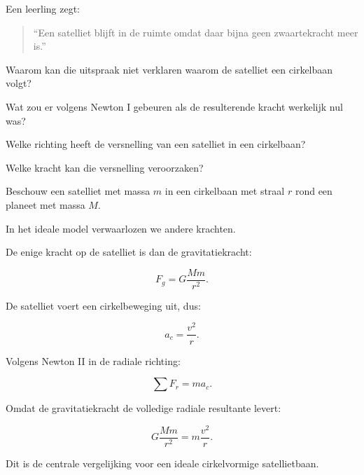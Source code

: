 \documentclass{ximera}
\begin{document}
\begin{oefening}{\oefU\ESS}

Een leerling zegt:

\begin{quote}
``Een satelliet blijft in de ruimte omdat daar bijna geen zwaartekracht
meer is.''
\end{quote}

\begin{question}
Waarom kan die uitspraak niet verklaren waarom de satelliet een
cirkelbaan volgt?
\end{question}

\begin{question}
Wat zou er volgens Newton I gebeuren als de resulterende kracht werkelijk
nul was?
\end{question}

\begin{question}
Welke richting heeft de versnelling van een satelliet in een
cirkelbaan?
\end{question}

\begin{question}
Welke kracht kan die versnelling veroorzaken?
\end{question}

\end{oefening}




Beschouw een satelliet met massa $m$ in een cirkelbaan met straal $r$
rond een planeet met massa $M$.

In het ideale model verwaarlozen we andere krachten.

De enige kracht op de satelliet is dan de gravitatiekracht:

\[
F_g=G\frac{Mm}{r^2}.
\]

De satelliet voert een cirkelbeweging uit, dus:

\[
a_c=\frac{v^2}{r}.
\]

Volgens Newton II in de radiale richting:

\[
\sum F_r=ma_c.
\]

Omdat de gravitatiekracht de volledige radiale resultante levert:

\[
G\frac{Mm}{r^2}
=
m\frac{v^2}{r}.
\]

Dit is de centrale vergelijking voor een ideale cirkelvormige
satellietbaan.
\end{document}
